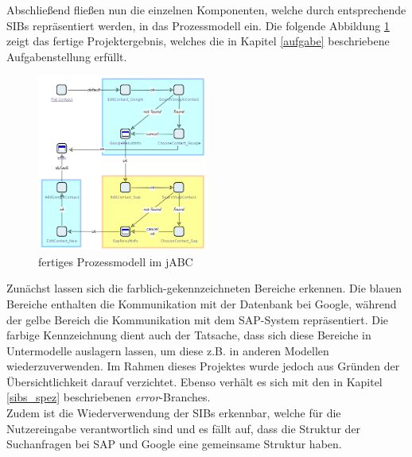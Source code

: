 

Abschließend fließen nun die einzelnen Komponenten, welche durch entsprechende SIBs repräsentiert werden, in das Prozessmodell ein. Die folgende Abbildung \ref{fig:jabcmodel} zeigt das fertige Projektergebnis, welches die in Kapitel \ref{aufgabe} beschriebene Aufgabenstellung erfüllt.\\

\begin{figure}[h!t]
\begin{center}
\includegraphics[width=0.5\textwidth]{Bilder/jabc_Model.png}
\end{center}
\caption{fertiges Prozessmodell im jABC}
\label{fig:jabcmodel} 
\end{figure} 

Zunächst lassen sich die farblich-gekennzeichneten Bereiche erkennen. Die blauen Bereiche enthalten die Kommunikation mit der Datenbank bei Google, während der gelbe Bereich die Kommunikation mit dem SAP-System repräsentiert. Die farbige Kennzeichnung dient auch der Tatsache, dass sich diese Bereiche in Untermodelle auslagern lassen, um diese z.B. in anderen Modellen wiederzuverwenden. Im Rahmen dieses Projektes wurde jedoch aus Gründen der Übersichtlichkeit darauf verzichtet. Ebenso verhält es sich mit den in Kapitel \ref{sibs_spez} beschriebenen \textit{error}-Branches. \\
Zudem ist die Wiederverwendung der SIBs erkennbar, welche für die Nutzereingabe verantwortlich sind und es fällt auf, dass die Struktur der Suchanfragen bei SAP und Google eine gemeinsame Struktur haben.


